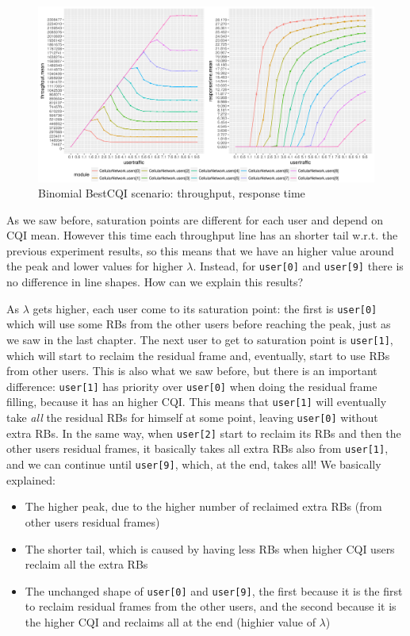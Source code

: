 \begin{figure}[H]
  \includegraphics[width=1\textwidth]{images/all-binombest.png}
  \caption{Binomial BestCQI scenario: throughput, response time}
  \label{fig:all-binombest}
\end{figure}
As we saw before, saturation points are different for each user and depend on CQI mean. However this time each throughput line has an shorter tail w.r.t. the previous experiment results, so this means that we have an higher value around the peak and lower values for higher \(\lambda\). Instead, for \texttt{user[0]} and \texttt{user[9]} there is no difference in line shapes. How can we explain this results?

As \(\lambda\) gets higher, each user come to its saturation point: the first is \texttt{user[0]} which will use some RBs from the other users before reaching the peak, just as we saw in the last chapter. The next user to get to saturation point is \texttt{user[1]}, which will start to reclaim the residual frame and, eventually, start to use RBs from other users. This is also what we saw before, but there is an important difference: \texttt{user[1]} has priority over \texttt{user[0]} when doing the residual frame filling, because it has an higher CQI. This means that \texttt{user[1]} will eventually take \textit{all} the residual RBs for himself at some point, leaving \texttt{user[0]} without extra RBs. In the same way, when \texttt{user[2]} start to reclaim its RBs and then the other users residual frames, it basically takes all extra RBs also from \texttt{user[1]}, and we can continue until \texttt{user[9]}, which, at the end, takes all!
We basically explained:
\begin{itemize}
	\item The higher peak, due to the higher number of reclaimed extra RBs (from other users residual frames)
	\item The shorter tail, which is caused by having less RBs when higher CQI users reclaim all the extra RBs
	\item The unchanged shape of \texttt{user[0]} and \texttt{user[9]}, the first because it is the first to reclaim residual frames from the other users, and the second because it is the higher CQI and reclaims all at the end (highier value of \(\lambda\))
\end{itemize}

